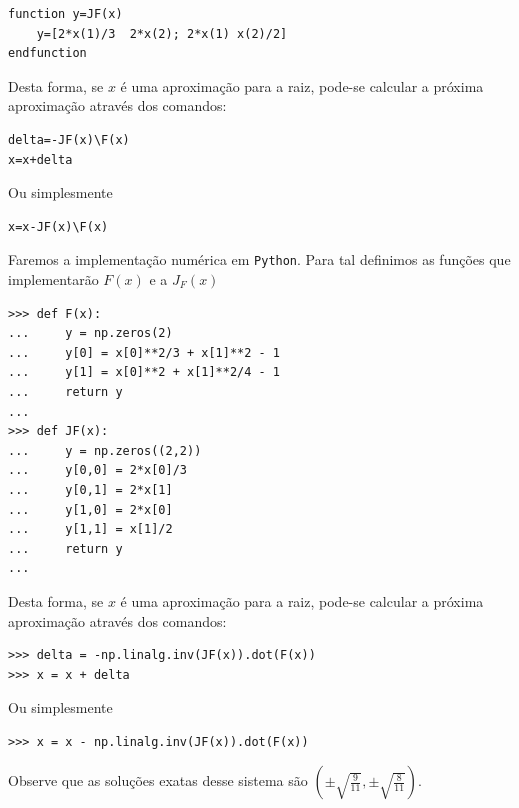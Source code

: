 \begin{ex}
\begin{verbatim}
function y=JF(x)
    y=[2*x(1)/3  2*x(2); 2*x(1) x(2)/2]
endfunction
\end{verbatim}
Desta forma, se $x$ é uma aproximação para a raiz, pode-se calcular a próxima aproximação através dos comandos:
\begin{verbatim}
delta=-JF(x)\F(x)
x=x+delta
\end{verbatim}
Ou simplesmente
\begin{verbatim}
x=x-JF(x)\F(x)
\end{verbatim}
\fi
\ifispython
Faremos a implementação numérica em \verb+Python+. Para tal definimos as funções que implementarão $F(x)$ e a $J_F(x)$
\begin{verbatim}
>>> def F(x):
...     y = np.zeros(2)
...     y[0] = x[0]**2/3 + x[1]**2 - 1
...     y[1] = x[0]**2 + x[1]**2/4 - 1
...     return y
... 
>>> def JF(x):
...     y = np.zeros((2,2))
...     y[0,0] = 2*x[0]/3
...     y[0,1] = 2*x[1]
...     y[1,0] = 2*x[0]
...     y[1,1] = x[1]/2
...     return y
... 
\end{verbatim}
Desta forma, se $x$ é uma aproximação para a raiz, pode-se calcular a próxima aproximação através dos comandos:
\begin{verbatim}
>>> delta = -np.linalg.inv(JF(x)).dot(F(x))
>>> x = x + delta
\end{verbatim}
Ou simplesmente
\begin{verbatim}
>>> x = x - np.linalg.inv(JF(x)).dot(F(x))
\end{verbatim}
\fi
Observe que as soluções exatas desse sistema são $\left(\pm \sqrt{\frac{9}{11}},\pm \sqrt{\frac{8}{11}}\right)$.
\end{ex}


